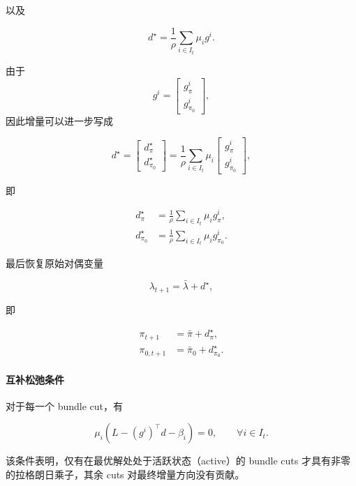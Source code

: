 \documentclass[11pt]{ctexart}
\begin{document}
以及

\begin{equation}
\boxed{
d^\star
=
\frac{1}{\rho}
\sum_{i\in I_t}
\mu_i g^i .
}
\label{eq:d_star}
\end{equation}

由于
\[
g^i=
\begin{bmatrix}
g_\pi^i\\
g_{\pi_0}^i
\end{bmatrix},
\]
因此增量可以进一步写成

\begin{equation}
d^\star
=
\begin{bmatrix}
d_\pi^\star\\
d_{\pi_0}^\star
\end{bmatrix}
=
\frac1\rho
\sum_{i\in I_t}
\mu_i
\begin{bmatrix}
g_\pi^i\\
g_{\pi_0}^i
\end{bmatrix},
\end{equation}

即

\begin{align}
d_\pi^\star
&=
\frac1\rho
\sum_{i\in I_t}
\mu_i g_\pi^i,
\\
d_{\pi_0}^\star
&=
\frac1\rho
\sum_{i\in I_t}
\mu_i g_{\pi_0}^i.
\end{align}

最后恢复原始对偶变量

\begin{equation}
\lambda_{t+1}
=
\bar{\lambda}
+
d^\star,
\end{equation}

即

\begin{align}
\pi_{t+1}
&=
\bar{\pi}
+
d_\pi^\star,
\\
\pi_{0,t+1}
&=
\bar{\pi}_0
+
d_{\pi_0}^\star.
\end{align}

\paragraph{互补松弛条件}

对于每一个 bundle cut，有

\begin{equation}
\mu_i
\left(
L
-
(g^i)^\top d
-
\beta_i
\right)
=
0,
\qquad
\forall i\in I_t.
\end{equation}

该条件表明，仅有在最优解处处于活跃状态（active）的 bundle cuts 才具有非零的拉格朗日乘子，其余 cuts 对最终增量方向没有贡献。
\end{document}
